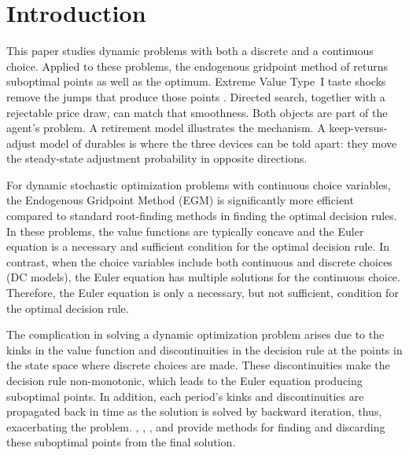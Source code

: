 \section{Introduction}
This paper studies dynamic problems with both a discrete and a continuous choice.
Applied to these problems, the endogenous gridpoint method of \citet{Carroll2006-mv}
returns suboptimal points as well as the optimum. Extreme Value Type~I taste shocks
remove the jumps that produce those points \citep{Iskhakov2017-jb}. Directed search,
together with a rejectable price draw, can match that smoothness. Both objects are
part of the agent's problem. A retirement model illustrates the mechanism. A
keep-versus-adjust model of durables is where the three devices can be told apart:
they move the steady-state adjustment probability in opposite directions.

For dynamic stochastic optimization problems with continuous choice variables, the
Endogenous Gridpoint Method (EGM) is significantly more efficient compared to
standard root-finding methods in finding the optimal decision rules. In these problems,
the value functions are typically concave and the Euler equation is a necessary and
sufficient condition for the optimal decision rule. In contrast, when the choice variables
include both continuous and discrete choices (DC models), the Euler equation has
multiple solutions for the continuous choice. Therefore, the Euler equation is only a
necessary, but not sufficient, condition for the optimal decision rule.

The complication in solving a dynamic optimization problem arises due to the kinks
in the value function and discontinuities in the decision rule at the points in the state
space where discrete choices are made. These discontinuities make the decision rule
non-monotonic, which leads to the Euler equation producing suboptimal points. In
addition, each period's kinks and discontinuities are propagated back in time as the
solution is solved by backward iteration, thus, exacerbating the problem.
\citet{Fella2014-pm}, \citet{Druedahl2017-ve}, \citet{Iskhakov2017-jb}, and \citet{dobrescu2022fast}
provide methods for finding and discarding these suboptimal points from the final
solution.

